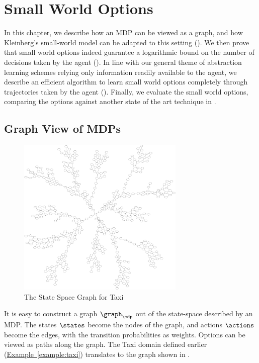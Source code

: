 \chapter{Small World Options}
\label{chap:sw}

In this chapter, we describe how an MDP can be viewed as a graph, and
how Kleinberg's small-world model can be adapted to this setting
(). We then prove that small world options
indeed guarantee a logarithmic bound on the number of decisions taken by
the agent (). In line with our general theme of
abstraction learning schemes relying only information readily available
to the agent, we describe an efficient algorithm to learn small world
options completely through trajectories taken by the agent
(). Finally, we evaluate the small world options,
comparing the options against another state of the art technique in
.

\section{Graph View of MDPs}
\label{sec:sw:graph-view}

\begin{figure}[th]
    \centering
    \includegraphics[height=3in]{figures/taxi1}
    \caption{The State Space Graph for Taxi}
    \label{fig:taxi-graph}
\end{figure}

It is easy to construct a graph $\graph_{\mdp}$ out of the state-space
described by an MDP. The states $\states$ become the nodes of the graph,
and actions $\actions$ become the edges, with the transition
probabilities as weights. Options can be viewed as paths along the
graph. The Taxi domain defined earlier
(\hyperref[example:taxi]{Example~\ref*{example:taxi}}) translates to the
graph shown in .

